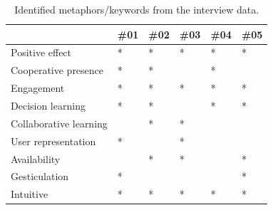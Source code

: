\begin{table}[H]
\centering
\begin{tabular}{l|lllll}
                        & \#01      & \#02     &\#03    &\#04 & \#05\\ \hline 
Positive effect         & *          &*          & *        & *     &*\\ 
Cooperative presence    & *          & *         &          & *     &\\ 
Engagement              & *          & *         & *        & *     &*\\ 
Decision learning       & *          & *         &          & *     &*\\ 
Collaborative learning  &            & *         & *        &       &\\ 
User representation     & *          &           & *        &       &\\ 
Availability            &            & *         & *        &       &*\\ 
Gesticulation           & *          &           &          &       &*\\ 
Intuitive               & *          & *         & *        &*      &*\\


\end{tabular}
\caption{Identified metaphors/keywords from the interview data.}
\label{table:phase3MethaphorsAnalysis}
\end{table}


